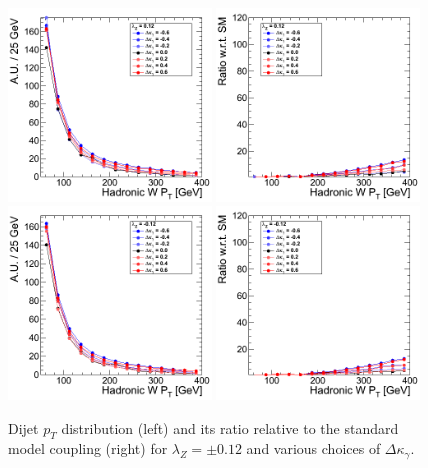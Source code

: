 \begin{figure}[h!t]
  {\centering
    \includegraphics[width=0.48\textwidth]{figs/HadronicWpT_012.png}
    \includegraphics[width=0.48\textwidth]{figs/HadronicWpT_012_ratio.png}
    \includegraphics[width=0.48\textwidth]{figs/HadronicWpT_m012.png}
    \includegraphics[width=0.48\textwidth]{figs/HadronicWpT_m012_ratio.png}
    \caption{Dijet $p_T$ distribution (left) and its ratio relative to 
    the standard model coupling (right) for $\lambda_Z = \pm 0.12$ and various choices of $\Delta{\kappa_\gamma}$.}
    \label{fig:ww_dijetPt_atgcRatio012}}
\end{figure}
